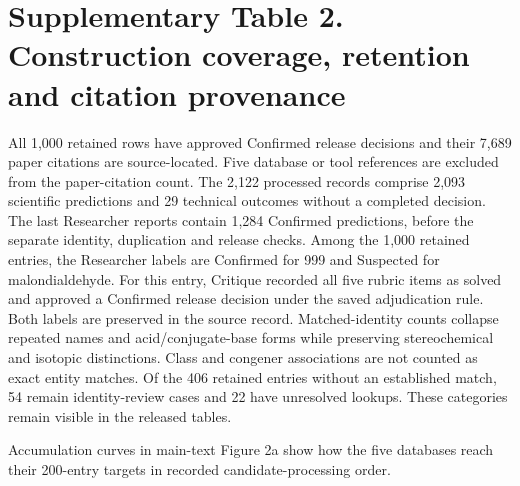 \documentclass[10pt]{article}
\begin{document}
\section*{Supplementary Table 2. Construction coverage, retention and citation provenance}
\begin{center}\small
{}\end{center}
All 1,000 retained rows have approved Confirmed release decisions and their 7,689 paper citations are source-located. Five database or tool references are excluded from the paper-citation count. The 2,122 processed records comprise 2,093 scientific predictions and 29 technical outcomes without a completed decision. The last Researcher reports contain 1,284 Confirmed predictions, before the separate identity, duplication and release checks. Among the 1,000 retained entries, the Researcher labels are Confirmed for 999 and Suspected for malondialdehyde. For this entry, Critique recorded all five rubric items as solved and approved a Confirmed release decision under the saved adjudication rule. Both labels are preserved in the source record. Matched-identity counts collapse repeated names and acid/conjugate-base forms while preserving stereochemical and isotopic distinctions. Class and congener associations are not counted as exact entity matches. Of the 406 retained entries without an established match, 54 remain identity-review cases and 22 have unresolved lookups. These categories remain visible in the released tables.

Accumulation curves in main-text Figure 2a show how the five databases reach their 200-entry targets in recorded candidate-processing order.

\end{document}

